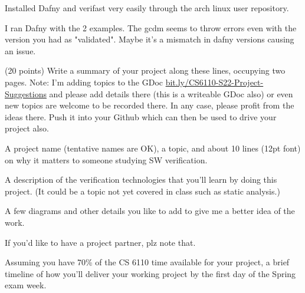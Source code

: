 \documentclass[11pt]{article}
\begin{document}
\begin{compactenum}
\begin{minipage}{\minpagw}
{{      Installed Dafny and verifast very easily through the arch linux user repository.
      
      I ran Dafny with the 2 examples. The gcdm seems to throw errors even with the version you had as "validated". Maybe it's a mismatch in dafny versions causing an issue.
    }%
  }%
\end{minipage}

\item (20 points)
  Write a summary of your project along these lines, occupying two pages.
  Note: I'm adding topics to the GDoc
  \url{bit.ly/CS6110-S22-Project-Suggestions}
  and please add details there (this is a writeable GDoc also) or even
  new topics are welcome to be recorded there. In any case, please
  profit from the ideas there.
  Push it into your Github which can then be used to drive your project also.
  \begin{compactitem}
  \item A project name (tentative names are OK), a topic,
    and about 10 lines (12pt font) on why it matters to
    someone studying SW verification.
    
  \item A description of the verification technologies that you'll learn
    by doing this project. (It could be a topic not yet covered in class
    such as static analysis.)

  \item A few diagrams and other details you like to add to give me a better
    idea of the work.

  \item If you'd like to have a project partner, plz note that.

  \item Assuming you have 70\% of the CS 6110 time available for your
    project, a brief timeline of how you'll deliver your working project
    by the first day of the Spring exam week.
  \end{compactitem}
  
\begin{minipage}{\minpagw}
\end{minipage}
\end{compactenum}
\end{document}
